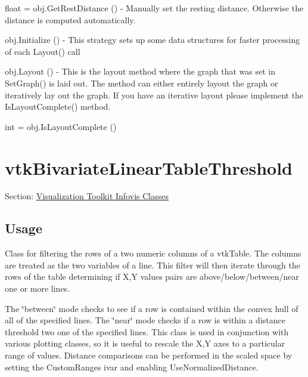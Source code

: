\begin{DoxyItemize}
\item {\ttfamily float = obj.\-Get\-Rest\-Distance ()} -\/ Manually set the resting distance. Otherwise the distance is computed automatically.  
\item {\ttfamily obj.\-Initialize ()} -\/ This strategy sets up some data structures for faster processing of each Layout() call  
\item {\ttfamily obj.\-Layout ()} -\/ This is the layout method where the graph that was set in Set\-Graph() is laid out. The method can either entirely layout the graph or iteratively lay out the graph. If you have an iterative layout please implement the Is\-Layout\-Complete() method.  
\item {\ttfamily int = obj.\-Is\-Layout\-Complete ()}  
\end{DoxyItemize}\hypertarget{vtkinfovis_vtkbivariatelineartablethreshold}{}\section{vtk\-Bivariate\-Linear\-Table\-Threshold}\label{vtkinfovis_vtkbivariatelineartablethreshold}
Section\-: \hyperlink{sec_vtkinfovis}{Visualization Toolkit Infovis Classes} \hypertarget{vtkwidgets_vtkxyplotwidget_Usage}{}\subsection{Usage}\label{vtkwidgets_vtkxyplotwidget_Usage}
Class for filtering the rows of a two numeric columns of a vtk\-Table. The columns are treated as the two variables of a line. This filter will then iterate through the rows of the table determining if X,Y values pairs are above/below/between/near one or more lines.

The \char`\"{}between\char`\"{} mode checks to see if a row is contained within the convex hull of all of the specified lines. The \char`\"{}near\char`\"{} mode checks if a row is within a distance threshold two one of the specified lines. This class is used in conjunction with various plotting classes, so it is useful to rescale the X,Y axes to a particular range of values. Distance comparisons can be performed in the scaled space by setting the Custom\-Ranges ivar and enabling Use\-Normalized\-Distance.

